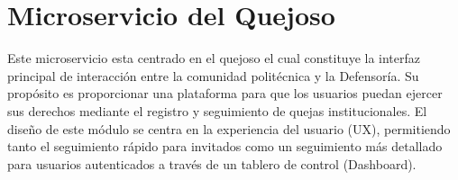 
\section{Microservicio del Quejoso}
\label{sec:modulo_quejoso}

Este microservicio esta centrado en el quejoso el cual constituye la interfaz principal de interacción entre la comunidad politécnica y la Defensoría. 
Su propósito es proporcionar una plataforma para que los usuarios puedan ejercer sus derechos mediante el registro y seguimiento de quejas institucionales. El diseño de este módulo se centra en la experiencia del usuario (UX), permitiendo tanto el seguimiento rápido para invitados como un seguimiento más detallado para usuarios autenticados a través de un tablero de control (Dashboard).





%
